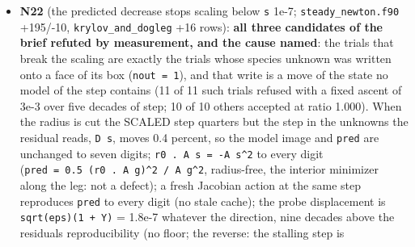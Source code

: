 \documentclass[english,a4paper]{my_memo}
\begin{document}
\begin{itemize}
  \texttt{restart\_round\_trip.sh}\textquotesingle s Python readers fixed. Deviations from the
  design, stated: no \texttt{EXHALE\_STATIONARY\_EVALUATE\_ONLY} env hook (the second
  word is the one answer); the \texttt{provenance\ unknown} mark is not yet in
  \texttt{EXHALE\_setup.out} (\texttt{write\_setup\_report.f90} not owned; one line);
  \texttt{species\_columns} reported not refused (the by-label species map is a
  documented path); \texttt{source} is the git revision, not an executable md5.
  \textbf{Consequence for the user (decision item 21)}: the exact \texttt{options}
  comparison forbids the option-ladder workflow (converge without an option,
  restart with it on); legacy pairs are unaffected, every new rung would be
  refused; the disciplined fix is a key naming the tokens allowed to differ.
  Also corrected: \texttt{docs/input\_schema.md} appendix D listed the retired
  \texttt{valve}/\texttt{fluxconst} fields and the wrong \texttt{base\_bc} values. Reported:
  \texttt{Run\ mode} is absent from \texttt{input\_schema.md}; the \texttt{EXHALE\_PTC=1} route
  writes no setup report; a re-evaluated state writes \texttt{sec\_ion\_step=0}.
\item
  \textbf{N22} (the predicted decrease stops scaling below \texttt{\textbar{}\textbar{}s\textbar{}\textbar{}} 1e-7;
  \texttt{steady\_newton.f90} +195/-10, \texttt{krylov\_and\_dogleg} +16 rows): \textbf{all three
  candidates of the brief refuted by measurement, and the cause named}:
  the trials that break the scaling are exactly the trials whose species
  unknown was written onto a face of its box (\texttt{nout\ =\ 1}), and that write is
  a move of the state no model of the step contains (11 of 11 such trials
  refused with a fixed ascent of 3e-3 over five decades of step; 10 of 10
  others accepted at ratio 1.000). When the radius is cut the SCALED step
  quarters but the step in the unknowns the residual reads, \texttt{\textbar{}\textbar{}D\ s\textbar{}\textbar{}},
  moves 0.4 percent, so the model image and \texttt{pred} are unchanged to seven
  digits; \texttt{r0\ .\ A\ s\ =\ -\textbar{}\textbar{}A\ s\textbar{}\textbar{}\^{}2} to every digit (\texttt{pred\ =\ 0.5\ (r0\ .\ A\ g)\^{}2\ /\ \textbar{}\textbar{}A\ g\textbar{}\textbar{}\^{}2}, radius-free, the interior minimizer along the leg: not a
  defect); a fresh Jacobian action at the same step reproduces \texttt{pred} to
  every digit (no stale cache); the probe displacement is \texttt{sqrt(eps)(1\ +\ \textbar{}\textbar{}Y\textbar{}\textbar{})} = 1.8e-7 whatever the direction, nine decades above the
  residual\textquotesingle s reproducibility (no floor; the reverse: the stalling step is

\end{itemize}
\end{document}
